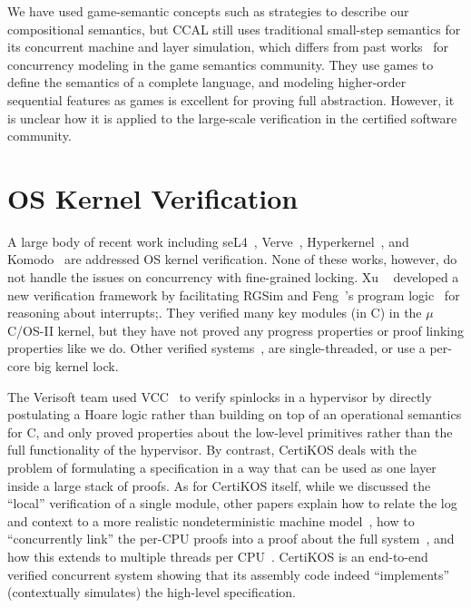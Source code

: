 
We have used
game-semantic concepts such as strategies to describe our
compositional semantics, 
but CCAL still uses traditional small-step semantics for its concurrent machine and layer simulation, which differs from 
past works~\cite{ghica08,nishimura13,rideau11,abramsky99}  for concurrency modeling in the game semantics community.
They use games to
define the semantics of a complete language, 
and modeling higher-order sequential features as games is excellent for proving full abstraction. 
However, it is unclear how it is applied to the large-scale verification in the certified software community.


\section{OS Kernel Verification} 

A large body
of recent work including
seL4~\cite{klein2009sel4,klein14},
Verve~\cite{hawblitzel10}, Hyperkernel~\cite{hyperkernel}, and Komodo~\cite{komodo} are 
addressed OS kernel verification.
None of these works, however, do not handle the issues on concurrency with fine-grained locking.
Xu \etal~\cite{xu16} developed a new verification framework by facilitating RGSim
and Feng~\etal's program logic~\cite{feng08:aim} for reasoning
about interrupts;.
They verified many key modules (in C) 
in the $\mu$C/OS-II kernel, but they have not proved
any progress properties or proof linking properties like we do.
Other verified systems~\cite{klein2009sel4,hawblitzel10,ironclad},
are single-threaded, or use a per-core big kernel lock.


The Verisoft team used VCC~\cite{leinenbach09} to verify spinlocks in a
hypervisor by directly postulating a Hoare logic rather than building
on top of an operational semantics for C, and only proved properties
about the low-level primitives rather than the full functionality of
the hypervisor. By contrast, CertiKOS deals with the problem of
formulating a specification in a way that can be used as one layer
inside a large stack of proofs. As for CertiKOS itself, while we
discussed the ``local'' verification of a single module, other papers
explain how to relate the log and context to a more realistic
nondeterministic machine model~\cite{certikos:osdi16}, how to
``concurrently link'' the per-CPU proofs into a proof about the full
system~, and how this extends to multiple threads per
CPU~\cite{concurrency}.
CertiKOS is an end-to-end verified concurrent system showing that its
assembly code indeed ``implements'' (contextually simulates) the
high-level specification.

